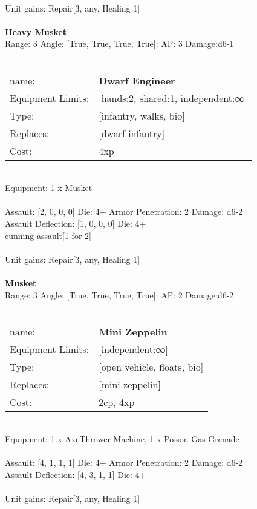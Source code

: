 \ \\
Unit gains: Repair[3, any, Healing 1]\\ 

\ \\
{\bf Heavy Musket } \\



Range: 3  Angle: [True, True, True, True]: AP: 3 Damage:d6-1 \\




 
\ \\

\noindent
\begin{tabular}{ll}
name: &{\bf Dwarf Engineer } \\
Equipment Limits: &[hands:2, shared:1, independent:∞] \\
Type: &[infantry, walks, bio] \\
Replaces: &[dwarf infantry] \\
Cost: & 4xp\\
\end{tabular}
\ \\
Equipment: 1 x Musket \\
\ \\
Assault: [2, 0, 0, 0] Die: 4+ Armor Penetration: 2 Damage: d6-2 \\
Assault Deflection: [1, 0, 0, 0] Die: 4+\\
\indent cunning assault[1 for 2]\\ 
 
\ \\
Unit gains: Repair[3, any, Healing 1]\\ 

\ \\
{\bf Musket } \\



Range: 3  Angle: [True, True, True, True]: AP: 2 Damage:d6-2 \\




 
\ \\

\noindent
\begin{tabular}{ll}
name: &{\bf Mini Zeppelin } \\
Equipment Limits: &[independent:∞] \\
Type: &[open vehicle, floats, bio] \\
Replaces: &[mini zeppelin] \\
Cost: & 2cp, 4xp\\
\end{tabular}
\ \\
Equipment: 1 x AxeThrower Machine, 1 x Poison Gas Grenade \\
\ \\
Assault: [4, 1, 1, 1] Die: 4+ Armor Penetration: 2 Damage: d6-2 \\
Assault Deflection: [4, 3, 1, 1] Die: 4+\\
\indent  
\ \\
Unit gains: Repair[3, any, Healing 1]\\ 

